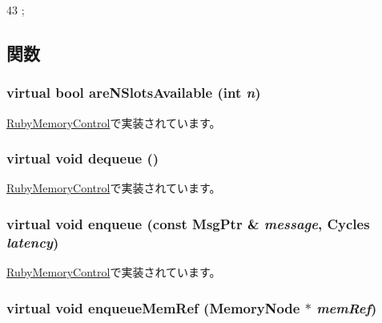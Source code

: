 \begin{DoxyCode}
43 {};
\end{DoxyCode}


\subsection{関数}
\hypertarget{classMemoryControl_ad5bc408383076d5b274d5c3be9b42c89}{
\subsubsection[{areNSlotsAvailable}]{\setlength{\rightskip}{0pt plus 5cm}virtual bool areNSlotsAvailable (int {\em n})}}
\label{classMemoryControl_ad5bc408383076d5b274d5c3be9b42c89}


\hyperlink{classRubyMemoryControl_a99a0d76f7266570912e6b0901cfaf9cf}{RubyMemoryControl}で実装されています。\hypertarget{classMemoryControl_abc9fc85f4dd561e833bf6b34a78ebcb8}{
\subsubsection[{dequeue}]{\setlength{\rightskip}{0pt plus 5cm}virtual void dequeue ()}}
\label{classMemoryControl_abc9fc85f4dd561e833bf6b34a78ebcb8}


\hyperlink{classRubyMemoryControl_a851b6644e3e336c07f8e6fe77234b97f}{RubyMemoryControl}で実装されています。\hypertarget{classMemoryControl_a8295a9f6c98555275292b9c1296ea35a}{
\subsubsection[{enqueue}]{\setlength{\rightskip}{0pt plus 5cm}virtual void enqueue (const {\bf MsgPtr} \& {\em message}, \/  {\bf Cycles} {\em latency})}}
\label{classMemoryControl_a8295a9f6c98555275292b9c1296ea35a}


\hyperlink{classRubyMemoryControl_a068a03cd419d33592fd584ec5877bb64}{RubyMemoryControl}で実装されています。\hypertarget{classMemoryControl_a8c508812a5b1b935117dc32877229599}{
\subsubsection[{enqueueMemRef}]{\setlength{\rightskip}{0pt plus 5cm}virtual void enqueueMemRef ({\bf MemoryNode} $\ast$ {\em memRef})}}
\label{classMemoryControl_a8c508812a5b1b935117dc32877229599}


